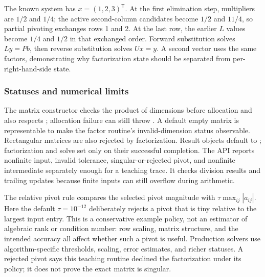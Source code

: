 The known system has \(x=(1,2,3)^\mathsf T\). At the first elimination step, multipliers are \(1/2\) and \(1/4\); the active second-column candidates become \(1/2\) and \(11/4\), so partial pivoting exchanges rows 1 and 2. At the last row, the earlier \(L\) values become \(1/4\) and \(1/2\) in that exchanged order. Forward substitution solves \(Ly=Pb\), then reverse substitution solves \(Ux=y\). A second vector uses the same factors, demonstrating why factorization state should be separated from per-right-hand-side state.

\subsubsection{Statuses and numerical limits}\label{01-foundations-i-ch019-statuses-and-numerical-limits}

\hypertarget{01-foundations-i-ch019-statuses-and-numerical-limits}{}

The matrix constructor checks the product of dimensions before allocation and also respects ; allocation failure can still throw . A default empty matrix is representable to make the factor routine's invalid-dimension status observable. Rectangular matrices are also rejected by factorization. Result objects default to ; factorization and solve set  only on their successful completion. The API reports nonfinite input, invalid tolerance, singular-or-rejected pivot, and nonfinite intermediate separately enough for a teaching trace. It checks division results and trailing updates because finite inputs can still overflow during arithmetic.

The relative pivot rule compares the selected pivot magnitude with \(\tau\max_{ij}|a_{ij}|\). Here the default \(\tau=10^{-12}\) deliberately rejects a pivot that is tiny relative to the largest input entry. This is a conservative example policy, not an estimator of algebraic rank or condition number: row scaling, matrix structure, and the intended accuracy all affect whether such a pivot is useful. Production solvers use algorithm-specific thresholds, scaling, error estimates, and richer statuses. A rejected pivot says this teaching routine declined the factorization under its policy; it does not prove the exact matrix is singular.

